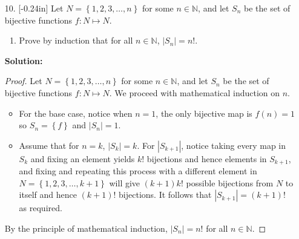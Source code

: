 \documentclass[letterpaper,12pt]{article}
\newcommand{\set}[1]{\left\{ #1 \right\}}
\theoremstyle{definition}
\begin{document}
\pagebreak
\begin{enumerate}
    \item[10.] \reversemarginpar{}[-0.24in] 
Let $N= \set{1,2,3,\ldots,n}$ for some $n \in \mathbb{N}$, and let $S_n$ be the set of bijective functions $f: N \mapsto N$. \begin{enumerate}
    \item Prove by induction that for all $n \in \mathbb{N}$, $|S_n|=n!$.
\end{enumerate}
 \begin{mdframed}
            \textbf{Solution:}
            \begin{proof}
               Let $N= \set{1,2,3,\ldots,n}$ for some $n \in \mathbb{N}$, and let $S_n$ be the set of bijective functions $f: N \mapsto N$. We proceed with mathematical induction on $n$. \begin{itemize}
                   \item For the base case, notice when $n = 1$, the only bijective map is $f(n) = 1$ so $S_n = \set{f}$ and $|S_n| = 1$.
                   \item Assume that for $n = k$, $|S_k| = k$. For $|S_{k+1}|$, notice taking every map in $S_k$ and fixing an element yields $k!$ bijections and hence elements in $S_{k+1}$, and fixing and repeating this process with a different element in $N = \set{1,2,3,\ldots,k+1}$ will give $(k+1)k!$ possible bijections from $N$ to itself and hence $(k+1)!$ bijections. It follows that $|S_{k+1} | = (k+1)!$ as required.
               \end{itemize} 
               By the principle of mathematical induction, $|S_n| = n!$ for all $n \in \mathbb{N}$.
            \end{proof}
        \end{mdframed}
\end{enumerate}
\pagebreak
\end{document}
